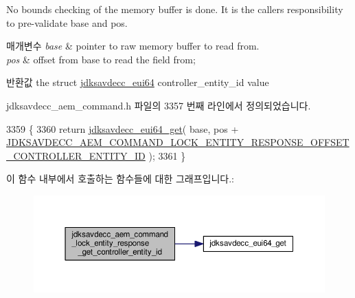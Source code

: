 No bounds checking of the memory buffer is done. It is the caller\textquotesingle{}s responsibility to pre-\/validate base and pos.


\begin{DoxyParams}{매개변수}
{\em base} & pointer to raw memory buffer to read from. \\
\hline
{\em pos} & offset from base to read the field from; \\
\hline
\end{DoxyParams}
\begin{DoxyReturn}{반환값}
the struct \hyperlink{structjdksavdecc__eui64}{jdksavdecc\+\_\+eui64} controller\+\_\+entity\+\_\+id value 
\end{DoxyReturn}


jdksavdecc\+\_\+aem\+\_\+command.\+h 파일의 3357 번째 라인에서 정의되었습니다.


\begin{DoxyCode}
3359 \{
3360     \textcolor{keywordflow}{return} \hyperlink{group__eui64_ga2652311a25a6b91cddbed75c108c7031}{jdksavdecc\_eui64\_get}( base, pos + 
      \hyperlink{group__command__lock__entity__response_gae759a0bde56c5a95069aedde584d8a22}{JDKSAVDECC\_AEM\_COMMAND\_LOCK\_ENTITY\_RESPONSE\_OFFSET\_CONTROLLER\_ENTITY\_ID}
       );
3361 \}
\end{DoxyCode}


이 함수 내부에서 호출하는 함수들에 대한 그래프입니다.\+:
\nopagebreak
\begin{figure}[H]
\begin{center}
\leavevmode
\includegraphics[width=350pt]{group__command__lock__entity__response_gac79d4d530768959d1e1d1dca0ddc6bf2_cgraph}
\end{center}
\end{figure}


